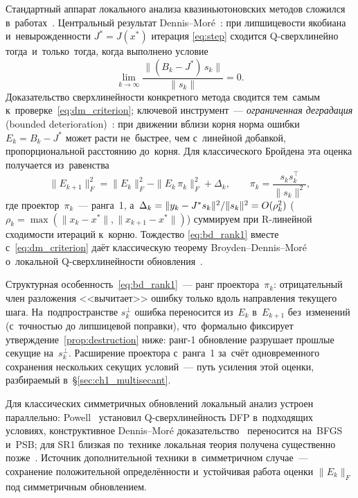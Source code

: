 Стандартный аппарат локального анализа квазиньютоновских методов
сложился в~работах~\cite{broyden1973,dennis1974,dennis1977,dennis1996}.
Центральный результат Dennis--Mor\'e~\cite{dennis1974}: при
липшицевости якобиана и~невырожденности $J^* = J(x^*)$ итерация
\eqref{eq:step} сходится Q-сверхлинейно тогда~и~только~тогда, когда
выполнено условие
\begin{equation}\label{eq:dm_criterion}
  \lim_{k\to\infty}\frac{\|(B_k - J^*)\,s_k\|}{\|s_k\|} = 0.
\end{equation}
Доказательство сверхлинейности конкретного метода сводится тем~самым
к~проверке~\eqref{eq:dm_criterion}; ключевой инструмент~---
\emph{ограниченная деградация} (bounded
deterioration)~\cite{broyden1973,dennis1996}: при движении вблизи
корня норма ошибки $E_k = B_k - J^*$ может расти не~быстрее, чем
с~линейной добавкой, пропорциональной расстоянию до~корня. Для
классического Бройдена эта оценка получается из~равенства
\begin{equation}\label{eq:bd_rank1}
  \|E_{k+1}\|_F^2 = \|E_k\|_F^2 - \|E_k\,\pi_k\|_F^2 + \Delta_k,
  \qquad \pi_k = \frac{s_k s_k^\top}{\|s_k\|^2},
\end{equation}
где проектор~$\pi_k$~--- ранга~1, а~$\Delta_k = \|y_k-J^{*} s_k\|^2/\|s_k\|^2 = O(\rho_k^2)$
($\rho_k = \max(\|x_k-x^*\|,\|x_{k+1}-x^*\|)$) суммируем при R-линейной
сходимости итераций к~корню. Тождество
\eqref{eq:bd_rank1} вместе с~\eqref{eq:dm_criterion} даёт классическую
теорему Broyden--Dennis--Mor\'e о~локальной Q-сверхлинейности
обновления~\cite{broyden1973}.

Структурная особенность~\eqref{eq:bd_rank1}~--- ранг проектора~$\pi_k$:
отрицательный член разложения <<вычитает>> ошибку только вдоль
направления текущего шага. На~подпространстве $s_k^\perp$ ошибка
переносится из~$E_k$ в~$E_{k+1}$ без~изменений (с~точностью до
липшицевой поправки), что~формально фиксирует
утверждение~\ref{prop:destruction} ниже: ранг-1 обновление разрушает
прошлые секущие на~$s_k^\perp$. Расширение проектора с~ранга~1
за~счёт одновременного сохранения нескольких секущих условий~---
путь усиления этой оценки, разбираемый в~\S\ref{sec:ch1_multisecant}.

Для классических симметричных обновлений локальный анализ устроен
параллельно: Powell~\cite{powell1971} установил Q-сверхлинейность DFP
в~подходящих условиях, конструктивное Dennis--Mor\'e
доказательство~\cite{dennis1977,dennis1996} переносится на~BFGS и~PSB;
для SR1 близкая по~технике локальная теория получена существенно
позже~\cite{conn1991}. Источник дополнительной техники в~симметричном
случае~--- сохранение положительной определённости и~устойчивая работа
оценки $\|E_k\|_F$ под симметричным обновлением.


